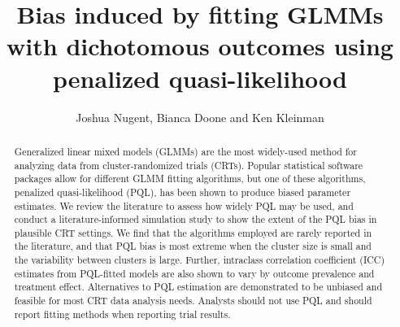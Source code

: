 \documentclass[Afour,times,sagev,doublespace]{sagej}
\begin{document}

\title{Bias induced by fitting GLMMs with dichotomous outcomes using penalized quasi-likelihood}

\author{Joshua Nugent, Bianca Doone and Ken Kleinman}





\begin{abstract}
Generalized linear mixed models (GLMMs) are the most widely-used method for analyzing data from cluster-randomized trials (CRTs). Popular statistical software packages allow for different GLMM fitting algorithms, but one of these algorithms, penalized quasi-likelihood (PQL), has been shown to produce biased parameter estimates. We review the literature to assess how widely PQL may be used, and conduct a literature-informed simulation study to show the extent of the PQL bias in plausible CRT settings. We find that the algorithms employed are rarely reported in the literature, and that PQL bias is most extreme when the cluster size is small and the variability between clusters is large. Further, intraclass correlation coefficient (ICC) estimates from PQL-fitted models are also shown to vary by outcome prevalence and treatment effect. Alternatives to PQL estimation are demonstrated to be unbiased and feasible for most CRT data analysis needs.  Analysts should not use PQL and should report fitting methods when reporting trial results.
\end{abstract}


\maketitle
\end{document}
